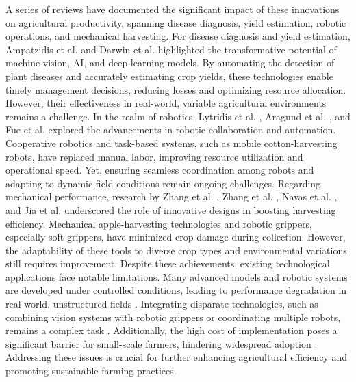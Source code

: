 \documentclass[a4paper,fleqn]{cas-dc}
\begin{document}
A series of reviews have documented the significant impact of these innovations on agricultural productivity, spanning disease diagnosis, yield estimation, robotic operations, and mechanical harvesting.
For disease diagnosis and yield estimation, Ampatzidis et al. \cite{ampatzidis2017ipathology} and Darwin et al. \cite{darwin2021recognition} highlighted the transformative potential of machine vision, AI, and deep-learning models. By automating the detection of plant diseases and accurately estimating crop yields, these technologies enable timely management decisions, reducing losses and optimizing resource allocation. However, their effectiveness in real-world, variable agricultural environments remains a challenge.
In the realm of robotics, Lytridis et al. \cite{lytridis2021overview}, Aragund et al. \cite{aravind2017task}, and Fue et al. \cite{fue2020extensive} explored the advancements in robotic collaboration and automation. Cooperative robotics and task-based systems, such as mobile cotton-harvesting robots, have replaced manual labor, improving resource utilization and operational speed. Yet, ensuring seamless coordination among robots and adapting to dynamic field conditions remain ongoing challenges.
Regarding mechanical performance, research by Zhang et al. \cite{zhang2016development,zhang2020technology}, Zhang et al. \cite{zhang2020state}, Navas et al. \cite{navas2021soft}, and Jia et al. \cite{jia2020apple} underscored the role of innovative designs in boosting harvesting efficiency. Mechanical apple-harvesting technologies and robotic grippers, especially soft grippers, have minimized crop damage during collection. However, the adaptability of these tools to diverse crop types and environmental variations still requires improvement.
Despite these achievements, existing technological applications face notable limitations. Many advanced models and robotic systems are developed under controlled conditions, leading to performance degradation in real-world, unstructured fields \cite{ampatzidis2017ipathology,darwin2021recognition}. Integrating disparate technologies, such as combining vision systems with robotic grippers or coordinating multiple robots, remains a complex task \cite{zhang2024automatic}. Additionally, the high cost of implementation poses a significant barrier for small-scale farmers, hindering widespread adoption \cite{mahmud2020robotics}. Addressing these issues is crucial for further enhancing agricultural efficiency and promoting sustainable farming practices.
\fi
\end{document}
